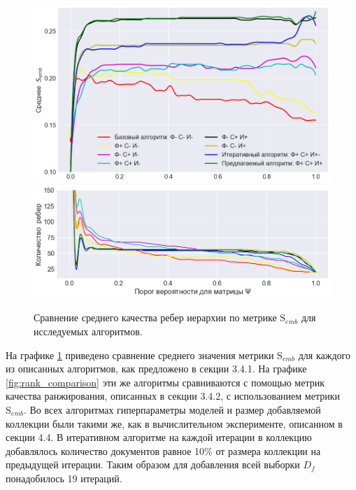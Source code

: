 \begin{figure}[h]
    \centering 
    \includegraphics[width=1\textwidth]{img/alg_comparison.png}
    \includegraphics[width=1\textwidth]{img/num_edges.png}
    \caption{\label{fig:alg_comparison}Сравнение среднего качества ребер иерархии по метрике $\mathrm{S}_{emb}$ для исследуемых алгоритмов.}
\end{figure}

На графике \ref{fig:alg_comparison} приведено сравнение среднего значения метрики $\mathrm{S}_{emb}$ для каждого из описанных алгоритмов, как предложено в секции 3.4.1. На графике \ref{fig:rank_comparison} эти же алгоритмы сравниваются с помощью метрик качества ранжирования, описанных в секции 3.4.2, с использованием метрики $\mathrm{S}_{emb}$. Во всех алгоритмах гиперпараметры моделей и размер добавляемой коллекции были такими же, как в вычислительном эксперименте, описанном в секции 4.4. В итеративном алгоритме на каждой итерации в коллекцию добавлялось количество документов равное 10\% от размера коллекции на предыдущей итерации. Таким образом для добавления всей выборки $D_f$ понадобилось 19 итераций.

